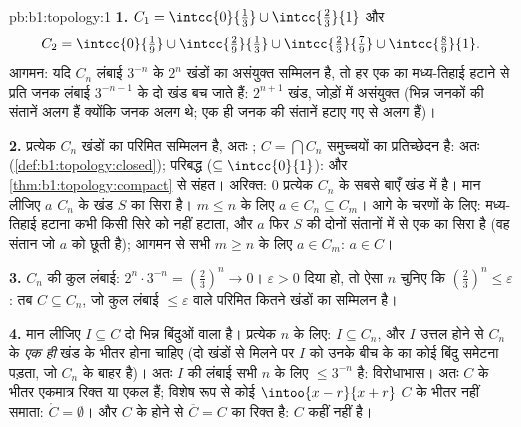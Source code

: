 \begin{solution}{pb:b1:topology:1}
\textbf{1.} $C_1 = \intcc{0}{\frac13} \cup \intcc{\frac23}{1}$ और
\[
C_2 = \intcc{0}{\tfrac19} \cup \intcc{\tfrac29}{\tfrac13}
\cup \intcc{\tfrac23}{\tfrac79} \cup \intcc{\tfrac89}{1} .
\]
आगमन: यदि $C_n$ लंबाई $3^{-n}$ के $2^n$  खंडों का असंयुक्त सम्मिलन है,
तो हर एक का  मध्य-तिहाई हटाने से प्रति जनक लंबाई $3^{-n-1}$ के दो 
खंड बच जाते हैं: $2^{n+1}$ खंड, जोड़ों में असंयुक्त (भिन्न जनकों की संतानें
अलग हैं क्योंकि जनक अलग थे; एक ही जनक की संतानें हटाए गए  से अलग हैं)।

\textbf{2.} प्रत्येक $C_n$ खंडों का परिमित सम्मिलन है, अतः ; $C =
\bigcap C_n$  समुच्चयों का प्रतिच्छेदन है: अतः 
(\cref{def:b1:topology:closed}); परिबद्ध ($\subseteq \intcc{0}{1}$): और
\cref{thm:b1:topology:compact} से संहत। अरिक्त: $0$ प्रत्येक $C_n$ के सबसे
बाएँ खंड में है। मान लीजिए $a$ $C_n$ के खंड $S$ का सिरा है। $m \leq n$ के
लिए $a \in C_n \subseteq C_m$। आगे के चरणों के लिए: मध्य-तिहाई हटाना कभी
किसी सिरे को नहीं हटाता, और $a$ फिर $S$ की दोनों संतानों में से एक का सिरा
है (वह संतान जो $a$ को छूती है); आगमन से सभी $m \geq n$ के लिए $a \in C_m$:
$a \in C$।

\textbf{3.} $C_n$ की कुल लंबाई: $2^n \cdot 3^{-n} = (\frac23)^n \to 0$।
$\varepsilon > 0$ दिया हो, तो ऐसा $n$ चुनिए कि $(\frac23)^n \leq
\varepsilon$: तब $C \subseteq C_n$, जो कुल लंबाई $\leq \varepsilon$ वाले
परिमित कितने खंडों का सम्मिलन है।

\textbf{4.} मान लीजिए $I \subseteq C$ दो भिन्न बिंदुओं वाला  है।
प्रत्येक $n$ के लिए: $I \subseteq C_n$, और $I$ उत्तल होने से $C_n$ के
\emph{एक ही} खंड के भीतर होना चाहिए (दो खंडों से मिलने पर $I$ को उनके बीच के
 का कोई बिंदु समेटना पड़ता, जो $C_n$ के बाहर है)। अतः $I$ की लंबाई सभी
$n$ के लिए $\leq 3^{-n}$ है: विरोधाभास। अतः $C$ के भीतर एकमात्र  रिक्त
या एकल हैं; विशेष रूप से कोई $\intoo{x-r}{x+r}$ $C$ के भीतर नहीं समाता:
$\mathring C = \emptyset$। और $C$ के  होने से $\overline C = C$ का
 रिक्त है: $C$ कहीं  नहीं है।


\end{solution}
